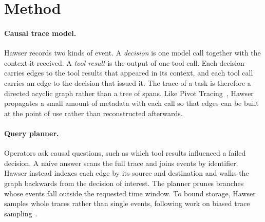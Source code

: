 \section{Method}
\label{sec:method}

\paragraph{Causal trace model.}
Hawser records two kinds of event.
A \emph{decision} is one model call together with the context it received.
A \emph{tool result} is the output of one tool call.
Each decision carries edges to the tool results that appeared in its context, and each tool call carries an edge to the decision that issued it.
The trace of a task is therefore a directed acyclic graph rather than a tree of spans.
Like Pivot Tracing~\cite{Mace2015}, Hawser propagates a small amount of metadata with each call so that edges can be built at the point of use rather than reconstructed afterwards.

\paragraph{Query planner.}
Operators ask causal questions, such as which tool results influenced a failed decision.
A naive answer scans the full trace and joins events by identifier.
Hawser instead indexes each edge by its source and destination and walks the graph backwards from the decision of interest.
The planner prunes branches whose events fall outside the requested time window.
To bound storage, Hawser samples whole traces rather than single events, following work on biased trace sampling~\cite{LasCasas2018,LasCasas2019}.
